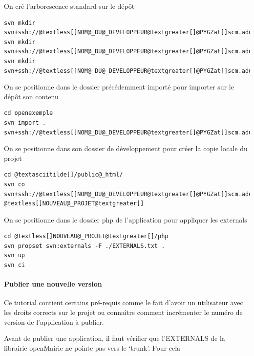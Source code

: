 \documentclass[letterpaper,10pt,french]{manual}
\begin{document}
On cré l'arborescence standard sur le dépôt

\begin{Verbatim}[commandchars=@\[\]]
svn mkdir svn+ssh://@textless[]NOM@_DU@_DEVELOPPEUR@textgreater[]@PYGZat[]scm.adullact.net/svnroot/@textless[]NOUVEAU@_PROJET@textgreater[]/trunk
svn mkdir svn+ssh://@textless[]NOM@_DU@_DEVELOPPEUR@textgreater[]@PYGZat[]scm.adullact.net/svnroot/@textless[]NOUVEAU@_PROJET@textgreater[]/tags
svn mkdir svn+ssh://@textless[]NOM@_DU@_DEVELOPPEUR@textgreater[]@PYGZat[]scm.adullact.net/svnroot/@textless[]NOUVEAU@_PROJET@textgreater[]/branches
\end{Verbatim}

On se positionne dans le dossier précédemment importé pour importer sur le
dépôt son contenu

\begin{Verbatim}[commandchars=@\[\]]
cd openexemple
svn import . svn+ssh://@textless[]NOM@_DU@_DEVELOPPEUR@textgreater[]@PYGZat[]scm.adullact.net/svnroot/@textless[]NOUVEAU@_PROJET@textgreater[]/trunk
\end{Verbatim}

On se positionne dans son dossier de développement pour créer la copie
locale du projet

\begin{Verbatim}[commandchars=@\[\]]
cd @textasciitilde[]/public@_html/
svn co svn+ssh://@textless[]NOM@_DU@_DEVELOPPEUR@textgreater[]@PYGZat[]scm.adullact.net/svnroot/@textless[]NOUVEAU@_PROJET@textgreater[]/trunk @textless[]NOUVEAU@_PROJET@textgreater[]
\end{Verbatim}

On se positionne dans le dossier php de l'application pour appliquer
les externals

\begin{Verbatim}[commandchars=@\[\]]
cd @textless[]NOUVEAU@_PROJET@textgreater[]/php
svn propset svn:externals -F ./EXTERNALS.txt .
svn up
svn ci
\end{Verbatim}


\paragraph{Publier une nouvelle version}

Ce tutorial contient certains pré-requis comme le fait d'avoir un utilisateur
avec les droits corrects sur le projet ou connaître comment incrémenter le
numéro de version de l'application à publier.

Avant de publier une application, il faut vérifier que l'EXTERNALS de la
librairie openMairie ne pointe pas vers le `trunk'. Pour cela
\end{document}
